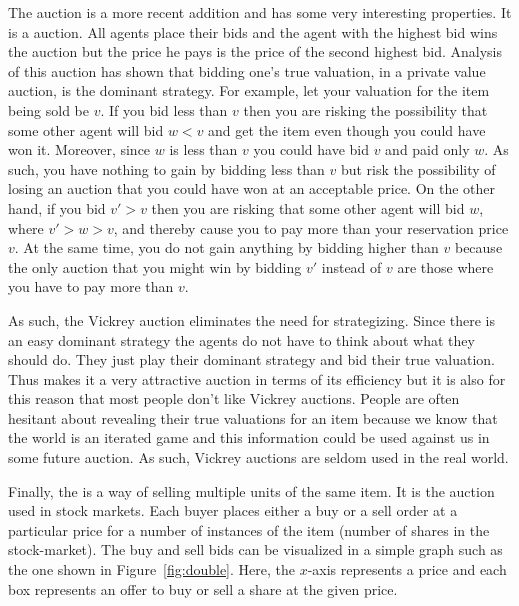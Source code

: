 The  auction is a more recent addition and has some very
interesting properties. It is a  auction.
All agents place their bids and the agent with the highest bid wins
the auction but the price he pays is the price of the second highest
bid. Analysis of this auction has shown that bidding one's true
valuation, in a private value auction, is the dominant strategy. For
example, let your valuation for the item being sold be $v$.  If you
bid less than $v$ then you are risking the possibility that some other
agent will bid $w < v$ and get the item even though you could have won
it.  Moreover, since $w$ is less than $v$ you could have bid $v$ and
paid only $w$.  As such, you have nothing to gain by bidding less than
$v$ but risk the possibility of losing an auction that you could have
won at an acceptable price. On the other hand, if you bid $v' > v$
then you are risking that some other agent will bid $w$, where $v'> w
> v$, and thereby cause you to pay more than your reservation price
$v$. At the same time, you do not gain anything by bidding higher than
$v$ because the only auction that you might win by bidding $v'$
instead of $v$ are those where you have to pay more than $v$.

 As such, the Vickrey auction eliminates the need for
strategizing.  Since there is an easy dominant strategy the agents do
not have to think about what they should do. They just play their
dominant strategy and bid their true valuation. Thus makes it a very
attractive auction in terms of its efficiency but it is also for this
reason that most people don't like Vickrey auctions. People are often
hesitant about revealing their true valuations for an item because we
know that the world is an iterated game and this information could be
used against us in some future auction. As such, Vickrey auctions are
seldom used in the real world.  \medskip

Finally, the  is a way of selling multiple units of
the same item. It is the auction used in stock markets. Each buyer
places either a buy or a sell order at a particular price for a number
of instances of the item (number of shares in the stock-market). The
buy and sell bids can be visualized in a simple graph such as the one
shown in Figure~\ref{fig:double}. Here, the $x$-axis represents a
price and each box represents an offer to buy or sell a share at the
given price.


